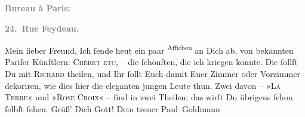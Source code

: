 \begin{ledgroupsized}[t]{13cm}
           \pstart
           \begin{otherlanguage}{french}\textcolor{gray}{\textbf{\textbf{Bureau à Paris:}}}\end{otherlanguage}\pend
           \pstart
           \begin{otherlanguage}{french}\textcolor{gray}{\textbf{\textbf{24. Rue Feydeau.}}}\end{otherlanguage}\pend
           \pstart\center{}Mein lieber Freund,\pend\pstart
           Ich ſende heut ein paar \substVorne{}\textsuperscript{Affichen}{\allowbreak}\substDazwischen{}\label{K_L02730-1v}\label{K_L02730-1h}\substHinten{} an Dich ab, von bekannten Pariſer Künſtlern: \textsc{Chéret}{ }\textsc{etc}, – die ſchönſten, die ich kriegen konnte. Die ſollſt Du
               mit \textsc{Richard} theilen, und Ihr ſollt Euch damit Euer Zimmer oder Vorzimmer dekoriren, wie
               dies hier die eleganten jungen Leute thun. Zwei davon – »\textsc{La Terre}« und »\textsc{Rose Croix}« – ſind in zwei Theilen; das wirſt Du übrigens ſchon ſelbſt ſehen. Grüß’ Dich
               Gott! Dein treuer\pend
           \pstart \spacefill\mbox{Paul Goldmann}\pend{}
         
         \endnumbering{}\end{ledgroupsized}  \newcommand{\dateiname}{L02730}\newcommand{\titel}{Paul Goldmann an Arthur Schnitzler, 7. 3. [1895]}\newcommand{\editorInnen}{Martin Anton Müller und Laura Untner}
            \footnotesize
\begin{ledgroupsized}[t]{11.5cm}
\end{ledgroupsized}
         
      